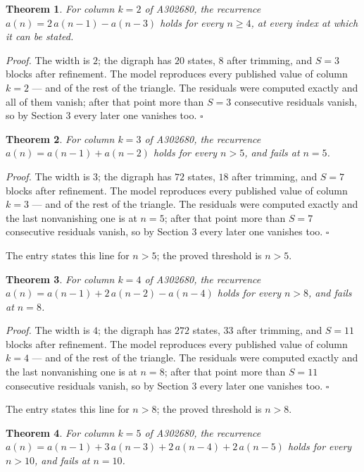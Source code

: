 \documentclass[11pt]{article}
\newtheorem{theorem}{Theorem}
\theoremstyle{definition}
\begin{document}
\begin{theorem} For column $k = 2$ of A302680, the recurrence $a(n) = 2\,a(n-1) - a(n-3)$ holds for every $n \ge 4$, at every index at which it can be stated.\end{theorem}

{\itshape Proof.} The width is $2$; the digraph has $20$ states, $8$ after trimming, and $S = 3$ blocks after refinement. The model reproduces every published value of column $k = 2$ --- and of the rest of the triangle. The residuals were computed exactly and all of them vanish; after that point more than $S = 3$ consecutive residuals vanish, so by Section 3 every later one vanishes too. $\square$

\begin{theorem} For column $k = 3$ of A302680, the recurrence $a(n) = a(n-1) + a(n-2)$ holds for every $n > 5$, and fails at $n = 5$.\end{theorem}

{\itshape Proof.} The width is $3$; the digraph has $72$ states, $18$ after trimming, and $S = 7$ blocks after refinement. The model reproduces every published value of column $k = 3$ --- and of the rest of the triangle. The residuals were computed exactly and the last nonvanishing one is at $n = 5$; after that point more than $S = 7$ consecutive residuals vanish, so by Section 3 every later one vanishes too. $\square$

The entry states this line for $n > 5$; the proved threshold is $n > 5$.

\begin{theorem} For column $k = 4$ of A302680, the recurrence $a(n) = a(n-1) + 2\,a(n-2) - a(n-4)$ holds for every $n > 8$, and fails at $n = 8$.\end{theorem}

{\itshape Proof.} The width is $4$; the digraph has $272$ states, $33$ after trimming, and $S = 11$ blocks after refinement. The model reproduces every published value of column $k = 4$ --- and of the rest of the triangle. The residuals were computed exactly and the last nonvanishing one is at $n = 8$; after that point more than $S = 11$ consecutive residuals vanish, so by Section 3 every later one vanishes too. $\square$

The entry states this line for $n > 8$; the proved threshold is $n > 8$.

\begin{theorem} For column $k = 5$ of A302680, the recurrence $a(n) = a(n-1) + 3\,a(n-3) + 2\,a(n-4) + 2\,a(n-5)$ holds for every $n > 10$, and fails at $n = 10$.\end{theorem}
\end{document}
